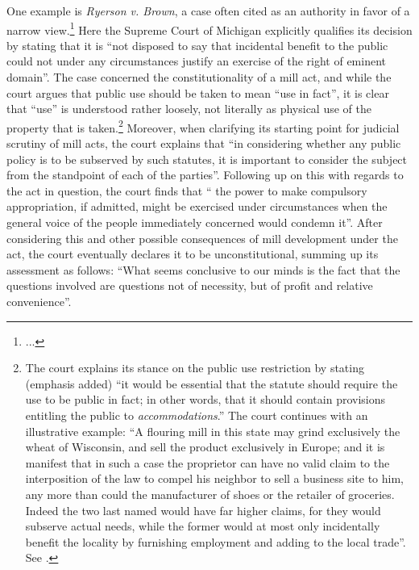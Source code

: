 One example is {\it Ryerson v. Brown}, a case often cited as an authority in favor of a narrow view.\footnote{...} Here the Supreme Court of Michigan explicitly qualifies its decision by stating that it is ``not disposed to say that incidental benefit to the public could not under any circumstances justify an exercise of the right of eminent domain''. The case concerned the constitutionality of a mill act, and while the court argues that public use should be taken to mean ``use in fact'', it is clear that ``use'' is understood rather loosely, not literally as physical use of the property that is taken.\footnote{The court explains its stance on the public use restriction by stating (emphasis added) ``it would be essential that the statute should require the use to be public in fact; in other words, that it should contain provisions entitling the public to {\it accommodations}.'' The court continues with an illustrative example: ``A flouring mill in this state may grind exclusively the wheat of Wisconsin, and sell the product exclusively in Europe; and it is manifest that in such a case the proprietor can have no valid claim to the interposition of the law to compel his neighbor to sell a business site to him, any more than could the manufacturer of shoes or the retailer of groceries. Indeed the two last named would have far higher claims, for they would subserve actual needs, while the former would at most only incidentally benefit the locality by furnishing employment and adding to the local trade''. See \cite[336]{ryerson77}.} Moreover, when clarifying its starting point for judicial scrutiny of mill acts, the court explains that ``in considering whether any public policy is to be subserved by such statutes, it is important to consider the subject from the standpoint of each of the parties''. Following up on this with regards to the act in question, the court finds that `` the power to make compulsory appropriation, if admitted, might be exercised under circumstances when the general voice of the people immediately concerned would condemn it''. After considering this and other possible consequences of mill development under the act, the court eventually declares it to be unconstitutional, summing up its assessment as follows: ``What seems conclusive to our minds is the fact that the questions involved are questions not of necessity, but of profit and relative convenience''.

